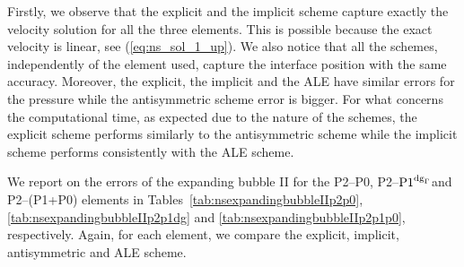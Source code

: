 \documentclass[a4paper,12pt,onecolumn]{article}
\newcommand{\pdg}{${\rm P1}^{{\rm dg}_\Gamma}$} %
\begin{document}
Firstly, we observe that the explicit and the implicit scheme capture exactly
the velocity solution for all the three elements. This is possible because the
exact velocity is linear, see (\ref{eq:ns_sol_1_up}). We  also notice that
all the schemes, independently of the element used, capture the interface
position with the same accuracy. Moreover, the explicit, the implicit and the
ALE have similar errors for the pressure while the antisymmetric scheme error
is bigger. For what concerns the computational time, as expected due to the
nature  of the schemes, the explicit scheme performs similarly to the
antisymmetric scheme while the implicit scheme performs consistently with the
ALE scheme.

We report on the errors of the expanding bubble II for the P2--P0, P2--\pdg and
P2--(P1+P0) elements in Tables~\ref{tab:nsexpandingbubbleIIp2p0},
\ref{tab:nsexpandingbubbleIIp2p1dg} and \ref{tab:nsexpandingbubbleIIp2p1p0},
respectively. Again, for each element, we compare the explicit, implicit,
antisymmetric and ALE scheme.
\end{document}
